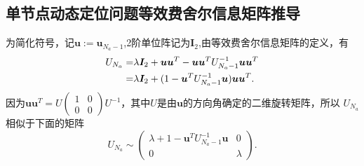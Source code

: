\subsection{单节点动态定位问题等效费舍尔信息矩阵推导}\label{B_F_1}
为简化符号，记$\bm{u}:=\bm{u}_{N_a-1}$,2阶单位阵记为$\bm{I}_2$,由等效费舍尔信息矩阵的定义，有
\begin{align}\notag\label{eq:initial_efim}
  U_{N_a}=&\lambda \bm{I}_2+\bm{u}\bm{u}^T-\bm{u}\bm{u}^T U_{N_a-1}^{-1}\bm{u}\bm{u}^T\\
  =&\lambda \bm{I}_2+(1-\bm{u}^T U_{N_a-1}^{-1}\bm{u})\bm{u}\bm{u}^T.
\end{align}
因为$\bm{u}\bm{u}^T=U\begin{pmatrix}
                     1 & 0 \\
                     0 & 0
                   \end{pmatrix}U^{-1}$，其中$U$是由$\bm{u}$的方向角确定的二维旋转矩阵，所以
$U_{N_a}$相似于下面的矩阵
\begin{equation}
U_{N_a}\sim \begin{pmatrix}
                           \lambda+1-\bm{u}^T U_{N_a-1}^{-1}\bm{u} & 0 \\
                           0 & \lambda
                         \end{pmatrix}.
\end{equation}

